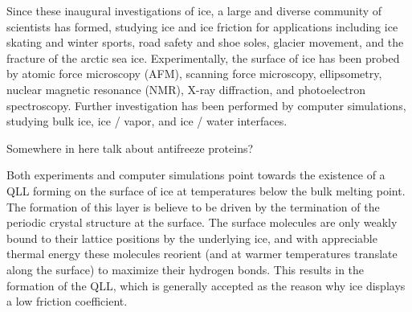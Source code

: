 Since these inaugural investigations of ice, a large and diverse
community of scientists has formed, studying ice and ice friction
for applications including ice skating and winter 
sports\cite{Rosenberg2005,Kietzig2010}, 
road safety and shoe soles\cite{Roberts1981,Higgins2008}, 
glacier movement\cite{Casassa1991, Sukhorukov2013, Pritchard2012},
and the fracture of the arctic sea 
ice\cite{Schulson2004,Weiss2007,Feltham2008,Lishman2011,Lishman2013}.  
Experimentally, the surface of ice has been probed by atomic force
microscopy
(AFM)\cite{Doppenschmidt1998,Bluhm1999,Bluhm2000}, scanning force
microscopy\cite{Bluhm1998}, ellipsometry\cite{Beaglehole1980,Beaglehole1993},
nuclear magnetic resonance (NMR)\cite{Ishizaki1996}, X-ray 
diffraction\cite{Dosch1996}, and photoelectron
spectroscopy\cite{Bluhm2002}. Further investigation has been performed by
computer simulations, studying bulk 
ice\cite{Kerr1988,Tse1988,Hayward1997,Gao2000,Rick2005,Dong2001,Weber1983,Wang2005,Kuo2005,Buch1998,Rick2001,Gay2002}, 
ice / vapor\cite{Kroes1992,Devlin1995,Ikeda-Fukazawa2004,Picaud2006,Conde2008,Pereyra2009},
and ice / water\cite{Baez1995,Bryk2002,Bryk2004,Bryk2004a,Gao2000,GarciaFernandez2006,Hayward2002,Hayward2001,Karim1988,Karim1987,Karim1990,Louden2013,Nada1997,NadaH.andFurukawa1995,Nada1996,Nada2000,Nada1997a} interfaces. 

Somewhere in here talk about antifreeze proteins?

Both experiments and computer simulations point towards the existence of a
QLL forming on the surface of ice at temperatures below
the bulk melting point. The formation of this layer is believe to be
driven by the termination of the periodic crystal structure at the
surface. The surface molecules are only weakly bound to their lattice
positions by the underlying ice, and with appreciable thermal energy
these molecules reorient (and at warmer temperatures translate along
the surface) to maximize their hydrogen bonds. This results in the
formation of the QLL, which is generally accepted as the reason why
ice displays a low friction 
coefficient\cite{Malenkov2009,Dash1995,Rosenberg2005,Dash2006}.



